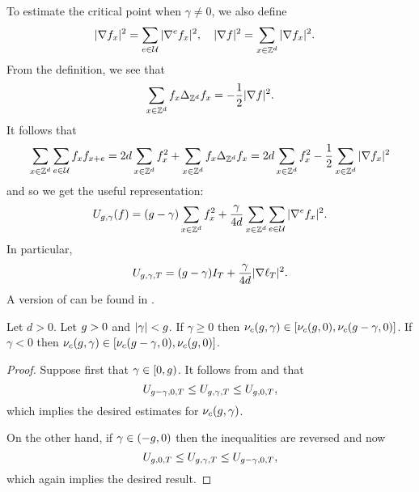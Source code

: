 To estimate the critical point when $\gamma \neq 0$,
we also define
\begin{align} \label{e:nabladef}
    |\nabla f_x|^2 &= \sum_{e\in\mathcal{U}}
    |\nabla^e f_x|^2,
    \quad
    |\nabla f|^2 = \sum_{x\in{ {{\mathbb Z}}^d }} |\nabla f_x|^2.
\end{align}
From the definition, we see that
\begin{equation}
\label{e:sbp}
\sum_{x\in{ {{\mathbb Z}}^d }}   f_x \Delta_{{ {{\mathbb Z}}^d }} f_x
=
-\frac{1}{2} |\nabla f|^2.
\end{equation}
It follows that
\begin{equation}
\sum_{x\in{ {{\mathbb Z}}^d }} \sum_{e\in\mathcal{U}} f_x f_{x+e}
=
2 d \sum_{x\in{ {{\mathbb Z}}^d }} f_x^2
+ \sum_{x\in{ {{\mathbb Z}}^d }} f_x \Delta_{{ {{\mathbb Z}}^d }} f_x
=
2 d \sum_{x\in{ {{\mathbb Z}}^d }} f_x^2
- \frac{1}{2} \sum_{x\in{ {{\mathbb Z}}^d }} |\nabla f_x|^2
\end{equation}
and so we get the useful representation:
\begin{equation}
\label{e:Udef-pos}
U_{g,\gamma}(f)
= (g - \gamma) \sum_{x\in{ {{\mathbb Z}}^d }} f_x^2
+ \frac{\gamma}{4d} \sum_{x\in{ {{\mathbb Z}}^d }} \sum_{e\in\mathcal{U}} |\nabla^e f_x|^2.
\end{equation}
In particular,
\begin{equation}
  \label{e:V2}
  U_{g,\gamma,T} =
  (g - \gamma) I_T
  + \frac{\gamma}{4d}
  |\nabla \ell_T|^2
  .
\end{equation}
A version of  can be found in \cite{HK01a}.

\begin{lemma}
\label{lem:nuc}
Let $d >0$.
Let $g>0$ and $|\gamma| < g$.
If $\gamma \ge 0$ then $\nu_c(g, \gamma) \in [\nu_c(g, 0),\nu_c(g-\gamma, 0)]$.
If $\gamma < 0$ then $\nu_c(g,\gamma) \in [\nu_c(g-\gamma,0),\nu_c(g,0)]$.
\end{lemma}

\begin{proof}
Suppose first that $\gamma \in [0,g)$.
It follows from  and  that
\begin{equation}
    U_{g-\gamma,0,T} \le U_{g,\gamma,T} \le  U_{g,0,T},
\end{equation}
which implies the desired estimates for $\nu_c(g,\gamma)$.

On the other hand,
if $\gamma \in (-g, 0)$ then the inequalities are reversed and now
\begin{equation}
    U_{g,0,T} \le U_{g,\gamma,T} \le  U_{g-\gamma,0,T},
\end{equation}
which again implies the desired result.
\end{proof}


